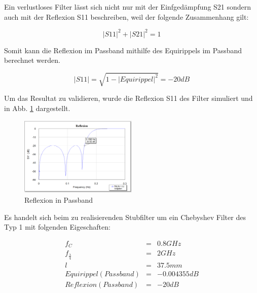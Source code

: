 Ein verlustloses Filter lässt sich nicht nur mit der Einfgedämpfung S21 sondern auch mit der Reflexion S11 beschreiben, weil der folgende Zusammenhang gilt:

\begin{equation}
{|S11|}^2 + {|S21|}^2 = 1
\end{equation}

Somit kann die Reflexion im Passband mithilfe des Equirippels im Passband berechnet werden.

\begin{equation}
|S11| = \sqrt{1-{|Equirippel|}^2} = -20 dB
\end{equation}

Um das Resultat zu validieren, wurde die Reflexion S11 des Filter simuliert und in Abb. \ref{fig:Prototyp_Reflexion} dargestellt.

\begin{figure}[h!]
\centering
 	\includegraphics[width=0.5\textwidth]{Prototyp_Reflexion.png}
 	\caption{Reflexion in Passband}
 	\label{fig:Prototyp_Reflexion}
\end{figure}

Es handelt sich beim zu realisierenden Stubfilter um ein Chebyshev Filter des Typ 1 mit folgenden Eigeschaften: 
\begin{mdframed}
\begin{equation*} 
\begin{array}{cllll} 
f_C & = & 0.8 GHz \\ 
f_\frac{\lambda}{4} & = & 2 GHz \\ 
l & = & 37.5mm \\
Equirippel (Passband) & = & -0.004355 dB \\
Reflexion (Passband) & = & -20 dB \\
\end{array} 
\end{equation*} 
\end{mdframed}



